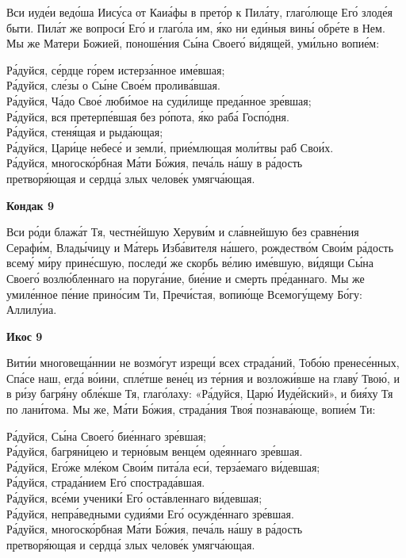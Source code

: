 \documentclass[14pt,article,oneside]{memoir}
\begin{document}
Вси иуде́и ведо́ша Иису́са от Каиа́фы в прето́р к Пила́ту, глаго́люще Его́ злоде́я быти. Пила́т же вопроси́ Его́ и глаго́ла им, я́ко ни еди́ныя вины́ обре́те в Нем. Мы же Матери Божией, поноше́ния Сы́на Своего́ ви́дящей, уми́льно вопие́м:

\noindent Ра́дуйся, се́рдце го́рем истерза́нное име́вшая;\\ Ра́дуйся, сле́зы о Сы́не Свое́м пролива́вшая.\\
Ра́дуйся, Ча́до Свое́ люби́мое на суди́лище преда́нное зре́вшая;\\ Ра́дуйся, вся претерпе́вшая без ро́пота, я́ко раба́ Госпо́дня.\\
Ра́дуйся, стеня́щая и рыда́ющая;\\ Ра́дуйся, Цари́це небесе́ и земли́, прие́млющая моли́твы раб Свои́х.\\
Ра́дуйся, многоско́рбная Ма́ти Бо́жия, печа́ль на́шу в ра́дость\\ \vin претворя́ющая и сердца́ злых челове́к умягча́ющая.

\begin{center}
  \textbf{Кондак 9}
\end{center}

Вси ро́ди блажа́т Тя, честне́йшую Херуви́м и сла́внейшую без сравне́ния Серафи́м, Влады́чицу и Ма́терь Изба́вителя на́шего, рождество́м Свои́м ра́дость всему́ ми́ру прине́сшую, последи́ же скорбь ве́лию име́вшую, ви́дящи Сы́на Своего́ возлю́бленнаго на поруга́ние, бие́ние и смерть пре́даннаго. Мы же умиле́нное пе́ние прино́сим Ти, Пречи́стая, вопию́ще Всемогу́щему Бо́гу: Аллилу́иа.

\pagebreak

\begin{center}
  \textbf{Икос 9}
\end{center}

Вити́и многовеща́ннии не возмо́гут изрещи́ всех страда́ний, Тобо́ю пренесе́нных, Спа́се наш, егда́ во́ини, спле́тше вене́ц из те́рния и возложи́вше на главу́ Твою́, и в ри́зу багря́ну обле́кше Тя, глаго́лаху: «Ра́дуйся, Царю́ Иуде́йский», и бия́ху Тя по лани́тома. Мы же, Ма́ти Бо́жия, страда́ния Твоя́ познава́юще, вопие́м Ти:

\noindent Ра́дуйся, Сы́на Своего́ бие́ннаго зре́вшая;\\ Ра́дуйся, багряни́цею и терно́вым венце́м оде́яннаго зре́вшая.\\
Ра́дуйся, Его́же мле́ком Свои́м пита́ла еси́, терза́емаго ви́девшая;\\ Ра́дуйся, страда́нием Его́ спострада́вшая.\\
Ра́дуйся, все́ми ученики́ Его́ оста́вленнаго ви́девшая;\\ Ра́дуйся, непра́ведными судия́ми Его́ осужде́ннаго зре́вшая.\\
Ра́дуйся, многоско́рбная Ма́ти Бо́жия, печа́ль на́шу в ра́дость\\ \vin претворя́ющая и сердца́ злых челове́к умягча́ющая.
\end{document}

